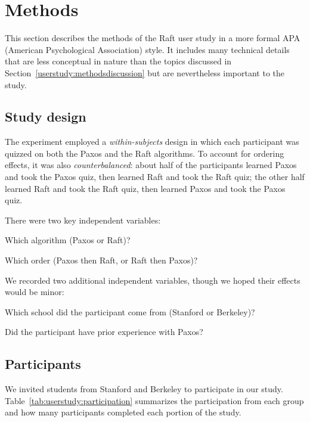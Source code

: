 \section{Methods}
\label{userstudy:methods}

This section describes the methods of the Raft user study in a more
formal APA
(American Psychological Association) style. It includes many technical
details that are less conceptual in nature than the topics discussed in
Section~\ref{userstudy:methodsdiscussion} but are nevertheless important
to the study.

\subsection{Study design}

The experiment employed a \emph{within-subjects} design in which each
participant was quizzed on both the Paxos and the Raft algorithms. To
account for ordering effects, it was also \emph{counterbalanced}: about
half of the participants learned Paxos and took the Paxos quiz, then
learned Raft and took the Raft quiz; the other half learned Raft and
took the Raft quiz, then learned Paxos and took the Paxos quiz.

There were two key independent variables:
\begin{compactitem}
\setlength{\itemindent}{2em}
\item Which algorithm (Paxos or Raft)?
\item Which order (Paxos then Raft, or Raft then Paxos)?
\end{compactitem}

We recorded two additional independent variables, though we hoped their
effects would be minor:
\begin{compactitem}
\setlength{\itemindent}{2em}
\item Which school did the participant come from (Stanford or Berkeley)?
\item Did the participant have prior experience with Paxos?
\end{compactitem}


\subsection{Participants}

We invited students from Stanford and Berkeley to participate in our
study. Table~\ref{tab:userstudy:participation} summarizes the
participation from each group and how many participants completed each
portion of the study.

